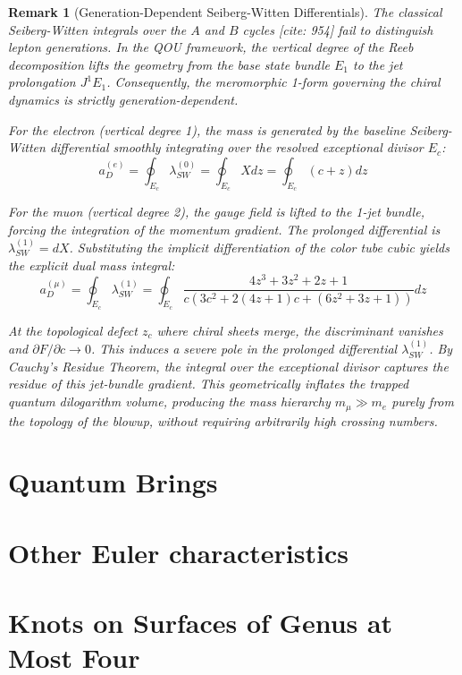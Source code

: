 \documentclass[12pt,a4paper]{report}
\newtheorem{remark}[theorem]{Remark}
\providecommand{\DIFaddtex}[1]{{\protect\color{DIFgreen} \sf #1}} %
\providecommand{\DIFaddbegin}{} %
\providecommand{\DIFadd}[1]{\texorpdfstring{\DIFaddtex{#1}}{#1}} %
\newcommand{\DIFaddincludegraphics}[2][]{{\color{DIFgreen}\fbox{\DIFOincludegraphics[#1]{#2}}}} %
\DeclareRobustCommand{\DIFaddbegin}{\DIFOaddbegin \let\includegraphics\DIFaddincludegraphics} %
\begin{document}
\begin{remark}[Generation-Dependent Seiberg-Witten Differentials]
The classical Seiberg-Witten integrals over the $A$ and $B$ cycles [cite: 954] fail to distinguish lepton generations. In the QOU framework, the vertical degree of the Reeb decomposition lifts the geometry from the base state bundle $E_1$ to the jet prolongation $J^1E_1$. Consequently, the meromorphic 1-form governing the chiral dynamics is strictly generation-dependent.

For the electron (vertical degree 1), the mass is generated by the baseline Seiberg-Witten differential smoothly integrating over the resolved exceptional divisor $E_c$:
$$a_D^{(e)} = \oint_{E_c} \lambda_{SW}^{(0)} = \oint_{E_c} X dz = \oint_{E_c} (c + z) dz$$

For the muon (vertical degree 2), the gauge field is lifted to the 1-jet bundle, forcing the integration of the momentum gradient. The prolonged differential is $\lambda_{SW}^{(1)} = dX$. Substituting the implicit differentiation of the color tube cubic yields the explicit dual mass integral:
$$a_D^{(\mu)} = \oint_{E_c} \lambda_{SW}^{(1)} = \oint_{E_c} \frac{4z^3+3z^2+2z+1}{c \left( 3c^2 + 2(4z+1)c + (6z^2+3z+1) \right)} dz$$

At the topological defect $z_c$ where chiral sheets merge, the discriminant vanishes and $\partial F / \partial c \to 0$. This induces a severe pole in the prolonged differential $\lambda_{SW}^{(1)}$. By Cauchy's Residue Theorem, the integral over the exceptional divisor captures the residue of this jet-bundle gradient. This geometrically inflates the trapped quantum dilogarithm volume, producing the mass hierarchy $m_\mu \gg m_e$ purely from the topology of the blowup, without requiring arbitrarily high crossing numbers.
\end{remark}


\section{Quantum Brings}
\label{sec:quantum-brings}





\section{Other Euler characteristics}
\label{sec:other-euler}

 


\DIFaddbegin \section{\DIFadd{Knots on Surfaces of Genus at Most Four}}
\DIFadd{\label{sec:knots-genus-leq-4}
}
\end{document}
